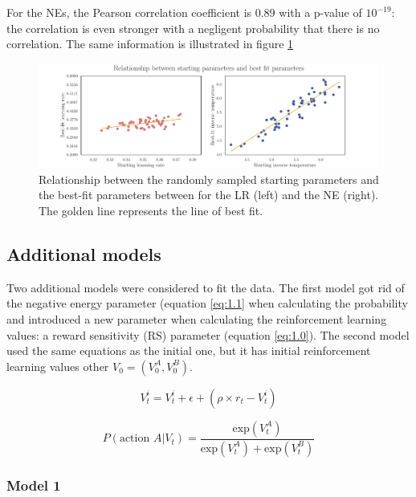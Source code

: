 \documentclass[12pt]{article}
\begin{document}
For the NEs, the Pearson correlation coefficient is 0.89 with a p-value of $10^{-19}$: the correlation is even stronger with a negligent probability that there is no correlation. The same information is illustrated in figure \ref{fig:2.5.1}

\begin{figure}[h!]
	\centering
	\hspace*{-0.6in}
	\includegraphics[width=1.15\linewidth]{figures/2.5.1.pdf}
	\caption{Relationship between the randomly sampled starting parameters and the best-fit parameters between for the LR (left) and the NE (right). The golden line represents the line of best fit.}
	\label{fig:2.5.1}
\end{figure}

\subsection{Additional models}

Two additional models were considered to fit the data. The first model got rid of the negative energy parameter (equation \ref{eq:1.1} when calculating the probability and introduced a new parameter when calculating the reinforcement learning values: a reward sensitivity (RS) parameter (equation \ref{eq:1.0}). The second model used the same equations as the initial one, but it has initial reinforcement learning values other $V_0 = (V^A_0, V^B_0)$. 

\begin{equation}
    V_t^i = V_t^i + \epsilon + (\rho \times r_t - V_t^i)
    \label{eq:1.0}
\end{equation}

\begin{equation}
    P(\text{action } A | V_t) = \frac{\mathrm{exp}(V_t^A)}{\mathrm{exp}(V_t^A) + \mathrm{exp}(V_t^B)}
    \label{eq:1.1}
\end{equation}

\subsubsection{Model 1}
\end{document}
